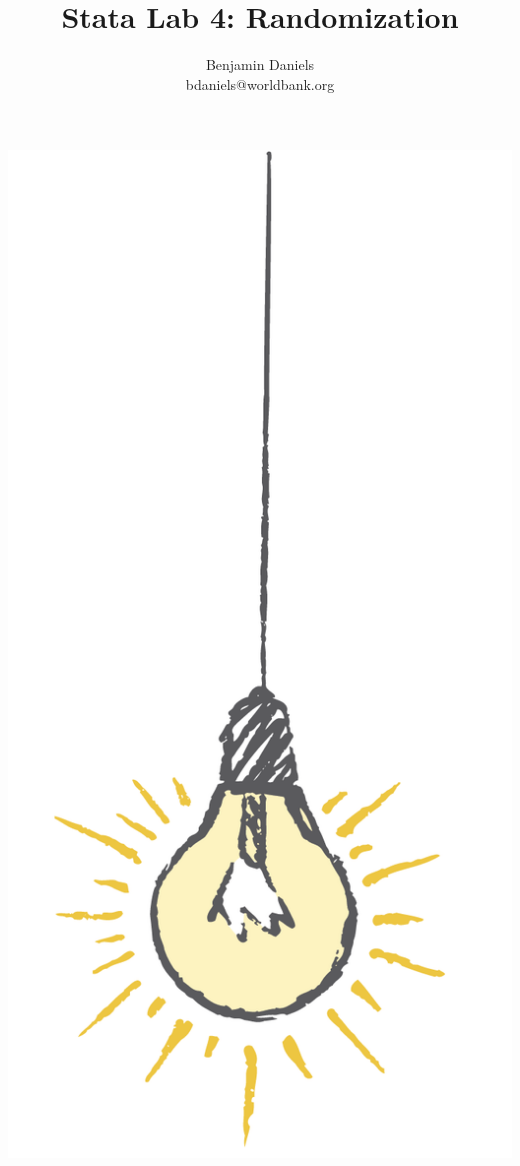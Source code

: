 \documentclass{tufte-handout}
\title{Stata Lab 4: Randomization}
\author{Benjamin Daniels \\ bdaniels@worldbank.org}
\begin{document}
\maketitle%

\begin{marginfigure}%
  \includegraphics[width=\linewidth]{light.png}
\end{marginfigure}
\end{document}
